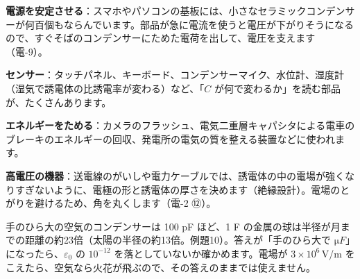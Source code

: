 \begin{phkougaku}[コンデンサーの使いみち]
\textbf{電源を安定させる}：スマホやパソコンの基板には、小さなセラミックコンデンサーが何百個もならんでいます。部品が急に電流を使うと電圧が下がりそうになるので、すぐそばのコンデンサーにためた電荷を出して、電圧を支えます（電-9）。

\textbf{センサー}：タッチパネル、キーボード、コンデンサーマイク、水位計、湿度計（湿気で誘電体の比誘電率が変わる）など、「$C$ が何で変わるか」を読む部品が、たくさんあります。

\textbf{エネルギーをためる}：カメラのフラッシュ、電気二重層キャパシタによる電車のブレーキのエネルギーの回収、発電所の電気の質を整える装置などに使われます。

\textbf{高電圧の機器}：送電線のがいしや電力ケーブルでは、誘電体の中の電場が強くなりすぎないように、電極の形と誘電体の厚さを決めます（絶縁設計）。電場のとがりを避けるため、角を丸くします（電-2 ⑫）。

\begin{phketa}[コンデンサーの数の目安]
手のひら大の空気のコンデンサーは 100 pF ほど、1 F の金属の球は半径が月までの距離の約23倍（太陽の半径の約13倍。例題10）。答えが「手のひら大で $\si{\micro F}$」になったら、$\varepsilon_0$ の $10^{-12}$ を落としていないか確かめます。電場が $3\times10^6$\,V/m をこえたら、空気なら火花が飛ぶので、その答えのままでは使えません。
\end{phketa}
\end{phkougaku}

